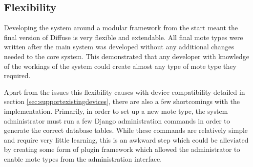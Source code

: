 \documentclass[a4papert,11pt,notitlepage]{ltxdoc}
\begin{document}

\subsection{Flexibility}
Developing the system around a modular framework from the start meant the final version of Diffuse is very flexible and extendable. All final mote types were written after the main system was developed without any additional changes needed to the core system. This demonstrated that any developer with knowledge of the workings of the system could create almost any type of mote type they required.

Apart from the issues this flexibility causes with device compatibility detailed in section \ref{sec:supportexistingdevices}, there are also a few shortcomings with the implementation. Primarily, in order to set up a new mote type, the system administrator must run a few Django administration commands in order to generate the correct database tables. While these commands are relatively simple and require very little learning, this is an awkward step which could be alleviated by creating some form of plugin framework which allowed the administrator to enable mote types from the administration interface. 












\end{document}
